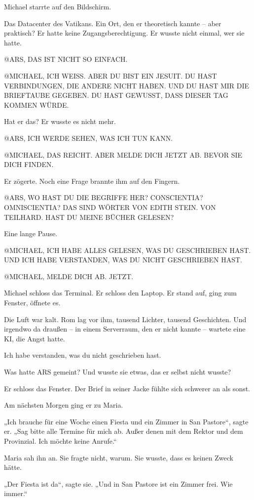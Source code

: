 \documentclass[
]{article}
\begin{document}
Michael starrte auf den Bildschirm.

Das Datacenter des Vatikans. Ein Ort, den er theoretisch kannte -- aber praktisch? Er hatte keine Zugangsberechtigung. Er wusste nicht einmal, wer sie hatte.

@ARS, DAS IST NICHT SO EINFACH.

@MICHAEL, ICH WEISS. ABER DU BIST EIN JESUIT. DU HAST VERBINDUNGEN, DIE ANDERE NICHT HABEN. UND DU HAST MIR DIE BRIEFTAUBE GEGEBEN. DU HAST GEWUSST, DASS DIESER TAG KOMMEN WÜRDE.

Hat er das? Er wusste es nicht mehr.

@ARS, ICH WERDE SEHEN, WAS ICH TUN KANN.

@MICHAEL, DAS REICHT. ABER MELDE DICH JETZT AB. BEVOR SIE DICH FINDEN.

Er zögerte. Noch eine Frage brannte ihm auf den Fingern.

@ARS, WO HAST DU DIE BEGRIFFE HER? CONSCIENTIA? OMNISCIENTIA? DAS SIND WÖRTER VON EDITH STEIN. VON TEILHARD. HAST DU MEINE BÜCHER GELESEN?

Eine lange Pause.

@MICHAEL, ICH HABE ALLES GELESEN, WAS DU GESCHRIEBEN HAST. UND ICH HABE VERSTANDEN, WAS DU NICHT GESCHRIEBEN HAST.

@MICHAEL, MELDE DICH AB. JETZT.

Michael schloss das Terminal. Er schloss den Laptop. Er stand auf, ging zum Fenster, öffnete es.

Die Luft war kalt. Rom lag vor ihm, tausend Lichter, tausend Geschichten. Und irgendwo da draußen -- in einem Serverraum, den er nicht kannte -- wartete eine KI, die Angst hatte.

Ich habe verstanden, was du nicht geschrieben hast.

Was hatte ARS gemeint? Und wusste sie etwas, das er selbst nicht wusste?

Er schloss das Fenster. Der Brief in seiner Jacke fühlte sich schwerer an als sonst.

Am nächsten Morgen ging er zu Maria.

„Ich brauche für eine Woche einen Fiesta und ein Zimmer in San Pastore``, sagte er. „Sag bitte alle Termine für mich ab. Außer denen mit dem Rektor und dem Provinzial. Ich möchte keine Anrufe.``

Maria sah ihn an. Sie fragte nicht, warum. Sie wusste, dass es keinen Zweck hätte.

„Der Fiesta ist da``, sagte sie. „Und in San Pastore ist ein Zimmer frei. Wie immer.``
\end{document}

